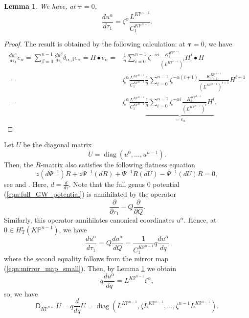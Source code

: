 \documentclass[12pt]{amsart}
\newtheorem{lem}[prop]{Lemma}
\numberwithin{equation}{section}
\newcommand{\KP}{K\mathbb{P}}
\DeclareMathOperator{\diag}{diag}
\begin{document}
\begin{lem}\label{lem:canonicalcoorder}
We have, at $\mathbf{\tau}=0$,
\begin{equation*}
\frac{du^{\alpha}}{d{\tau_1}}=\zeta^{\alpha}\frac{L^{\KP^{n-1}}}{C^{\KP^{n-1}}_1}.
\end{equation*}
\end{lem}

\begin{proof}
The result is obtained by the following calculation: at $\mathbf{\tau}=0$, we have
\begin{align*}
\frac{du^{\alpha}}{d{\tau_1}}{e_{\alpha}}=\sum_{\beta=0}^{n-1}\frac{d {u^{\beta}}}{d{\tau_1}}\delta_{\alpha,\beta}{e_{\alpha}}=H\bullet{e_{\alpha}}
=&\frac{1}{n}\sum_{i=0}^{n-1}\zeta^{-\alpha{i}}\frac{K^{\KP^{n-1}}_i}{(L^{\KP^{n-1}})^i}{H^i}\bullet{H}\\
=&\zeta^{\alpha}\frac{L^{\KP^{n-1}}}{C^{\KP^{n-1}}_1}\frac{1}{n}\sum_{i=0}^{n-1}\zeta^{-\alpha{(i+1)}}\frac{K^{\KP^{n-1}}_{i+1}}{(L^{\KP^{n-1}})^{i+1}}H^{i+1}\\
=&\zeta^{\alpha}\frac{L^{\KP^{n-1}}}{C^{\KP^{n-1}}_1}\underbrace{\frac{1}{n}\sum_{i=0}^{n-1}\zeta^{-\alpha{i}}\frac{K^{\KP^{n-1}}_i}{(L^{\KP^{n-1}})^i}H^i}_{=e_{\alpha}}.
\end{align*}
\end{proof}

Let $U$ be the diagonal matrix
\begin{equation*}
U=\diag(u^0,\ldots,u^{n-1}).
\end{equation*}
Then, the $R$-matrix also satisfies the following flatness equation
\begin{equation}\label{eqn:Basic_flatness_d}
z(d\Psi^{-1})R+z\Psi^{-1}(dR)+\Psi^{-1}R (dU)-\Psi^{-1}(dU) R=0,    
\end{equation}
see \cite[Chapter 1, Section 4.6]{lp} and \cite[Proposition 1.1]{g1}. Here, $d=\frac{d}{d\tau}$.
Note that the full genus $0$ potential (\ref{eqn:full_GW_potential}) is annihilated by the operator
\begin{equation}\label{eqn:annihilatoroperator}
\frac{\partial}{\partial{\tau_1}}-Q\frac{\partial}{\partial{Q}}.
\end{equation}
Similarly, this operator annihilates canonical coordinates $u^{\alpha}$. Hence, at $0\in H^{\star}_{\mathrm{T}}\left(\KP^{n-1}\right)$, we have
\begin{equation*}
\frac{du^{\alpha}}{d{\tau_1}}=Q\frac{du^{\alpha}}{dQ}=\frac{1}{C^{\KP^{n-1}}_1}q\frac{du^{\alpha}}{dq}
\end{equation*}
where the second equality follows from the mirror map (\ref{eqn:mirror_map_small}). Then, by Lemma \ref{lem:canonicalcoorder} we obtain
\begin{equation}
q\frac{du^{\alpha}}{dq}=L^{\KP^{n-1}}\zeta^{\alpha},
\end{equation}
so, we have
\begin{equation}\label{eqn:DU}
\mathsf{D}_{\KP^{n-1}}U=q\frac{d}{dq}U=\diag(L^{\KP^{n-1}},{\zeta}L^{\KP^{n-1}},...,\zeta^{n-1}L^{\KP^{n-1}}).
\end{equation}
\end{document}
